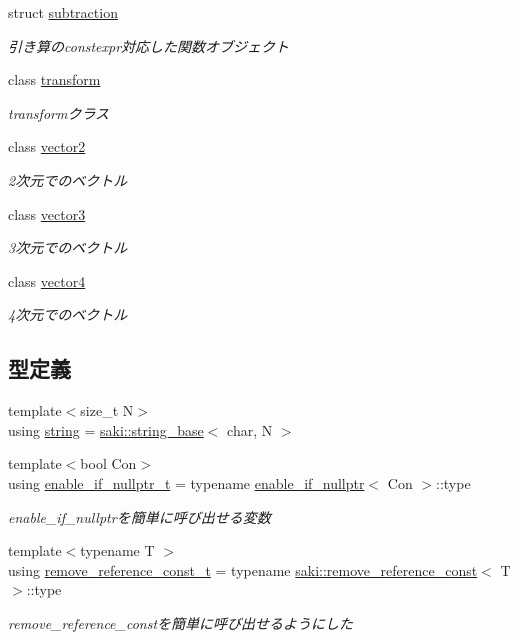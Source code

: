 \begin{DoxyCompactItemize}
struct \mbox{\hyperlink{structsaki_1_1subtraction}{subtraction}}
\begin{DoxyCompactList}\small\item\em 引き算のconstexpr対応した関数オブジェクト \end{DoxyCompactList}\item 
class \mbox{\hyperlink{classsaki_1_1transform}{transform}}
\begin{DoxyCompactList}\small\item\em transformクラス \end{DoxyCompactList}\item 
class \mbox{\hyperlink{classsaki_1_1vector2}{vector2}}
\begin{DoxyCompactList}\small\item\em 2次元でのベクトル \end{DoxyCompactList}\item 
class \mbox{\hyperlink{classsaki_1_1vector3}{vector3}}
\begin{DoxyCompactList}\small\item\em 3次元でのベクトル \end{DoxyCompactList}\item 
class \mbox{\hyperlink{classsaki_1_1vector4}{vector4}}
\begin{DoxyCompactList}\small\item\em 4次元でのベクトル \end{DoxyCompactList}\end{DoxyCompactItemize}
\subsection*{型定義}
\begin{DoxyCompactItemize}
\item 
{\footnotesize template$<$size\+\_\+t N$>$ }\\using \mbox{\hyperlink{namespacesaki_a47847d63f1d9c97ca37f33eeecb27674}{string}} = \mbox{\hyperlink{classsaki_1_1string__base}{saki\+::string\+\_\+base}}$<$ char, N $>$
\item 
{\footnotesize template$<$bool Con$>$ }\\using \mbox{\hyperlink{namespacesaki_a4c362f5119aac94085eab0bf794facf7}{enable\+\_\+if\+\_\+nullptr\+\_\+t}} = typename \mbox{\hyperlink{structsaki_1_1enable__if__nullptr}{enable\+\_\+if\+\_\+nullptr}}$<$ Con $>$\+::type
\begin{DoxyCompactList}\small\item\em enable\+\_\+if\+\_\+nullptrを簡単に呼び出せる変数 \end{DoxyCompactList}\item 
{\footnotesize template$<$typename T $>$ }\\using \mbox{\hyperlink{namespacesaki_aff6964622fdfcdf489dab4b87727a8e4}{remove\+\_\+reference\+\_\+const\+\_\+t}} = typename \mbox{\hyperlink{structsaki_1_1remove__reference__const}{saki\+::remove\+\_\+reference\+\_\+const}}$<$ T $>$\+::type
\begin{DoxyCompactList}\small\item\em remove\+\_\+reference\+\_\+constを簡単に呼び出せるようにした \end{DoxyCompactList}\end{DoxyCompactItemize}
